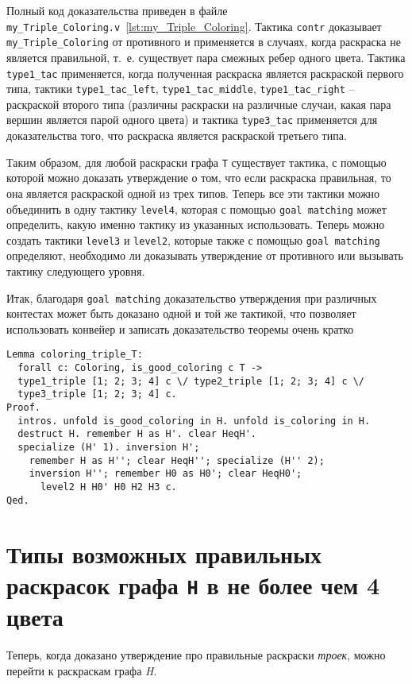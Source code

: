Полный код доказательства приведен в файле {\tt my\_Triple\_Coloring.v}~\ref{lst:my_Triple_Coloring}. Тактика {\tt contr} доказывает {\tt my\_Triple\_Coloring} от противного и применяется в случаях, когда раскраска не является правильной, т.~е. существует пара смежных ребер одного цвета. Тактика {\tt type1\_tac} применяется, когда полученная раскраска является раскраской первого типа, тактики {\tt type1\_tac\_left}, {\tt type1\_tac\_middle}, {\tt type1\_tac\_right} -- раскраской второго типа (различны раскраски на различные случаи, какая пара вершин является парой одного цвета) и тактика {\tt type3\_tac} применяется для доказательства того, что раскраска является раскраской третьего типа.

Таким образом, для любой раскраски графа {\tt T} существует тактика, с помощью которой можно доказать утверждение о том, что если раскраска правильная, то она является раскраской одной из трех типов. Теперь все эти тактики можно объединить в одну тактику {\tt level4}, которая с помощью {\tt goal matching} может определить, какую именно тактику из указанных использовать. Теперь можно создать тактики {\tt level3} и {\tt level2}, которые также с помощью {\tt goal matching} определяют, необходимо ли доказывать утверждение от противного или вызывать тактику следующего уровня.

Итак, благодаря {\tt goal matching} доказательство утверждения при различных контестах может быть доказано одной и той же тактикой, что позволяет использовать конвейер и записать доказательство теоремы очень кратко

\begin{verbatim}
Lemma coloring_triple_T:
  forall c: Coloring, is_good_coloring c T ->
  type1_triple [1; 2; 3; 4] c \/ type2_triple [1; 2; 3; 4] c \/
  type3_triple [1; 2; 3; 4] c.
Proof.
  intros. unfold is_good_coloring in H. unfold is_coloring in H. 
  destruct H. remember H as H'. clear HeqH'. 
  specialize (H' 1). inversion H';
    remember H as H''; clear HeqH''; specialize (H'' 2); 
    inversion H''; remember H0 as H0'; clear HeqH0';
      level2 H H0' H0 H2 H3 c.
Qed.
\end{verbatim}

\section{Типы возможных правильных раскрасок графа {\tt H} в не более чем 4 цвета}

Теперь, когда доказано утверждение про правильные раскраски {\it троек}, можно перейти к раскраскам графа {\it H}.

